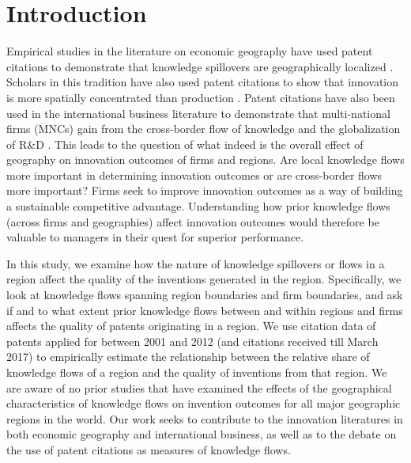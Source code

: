 \documentclass[12pt,letterpaper]{article}
\begin{document}
\section*{Introduction}
\noindent Empirical studies in the literature on economic geography have used patent citations to demonstrate that knowledge spillovers are geographically localized \citep*{Jaffe1993, Almeida1999, Branstetter2001, Sonn2008}. Scholars in this tradition have also used patent citations to show that innovation is more spatially concentrated than production \citep{Feldman1994a}. Patent citations have also been used in the international business literature to demonstrate that multi-national firms (MNCs) gain from the cross-border flow of knowledge and the globalization of R\&D \citep{Singh2007, Zhao2006, Singh2013}. This leads to the question of what indeed is the overall effect of geography on innovation outcomes of firms and regions. Are local knowledge flows more important in determining innovation outcomes or are cross-border flows more important? Firms seek to improve innovation outcomes as a way of building a sustainable competitive advantage. Understanding how prior knowledge flows (across firms and geographies) affect innovation outcomes would therefore be valuable to managers in their quest for superior performance. \par

In this study, we examine how the nature of knowledge spillovers or flows in a region affect the quality of the inventions generated in the region. Specifically, we look at knowledge flows spanning region boundaries and firm boundaries, and ask if and to what extent prior knowledge flows between and within regions and firms affects the quality of patents originating in a region. We use citation data of patents applied for between 2001 and 2012 (and citations received till March 2017) to empirically estimate the relationship between the relative share of knowledge flows of a region and the quality of inventions from that region. We are aware of no prior studies that have examined the effects of the geographical characteristics of knowledge flows on invention outcomes for all major geographic regions in the world. Our work seeks to contribute to the innovation literatures in both economic geography and international business, as well as to the debate on the use of patent citations as measures of knowledge flows. \par 
\end{document}
